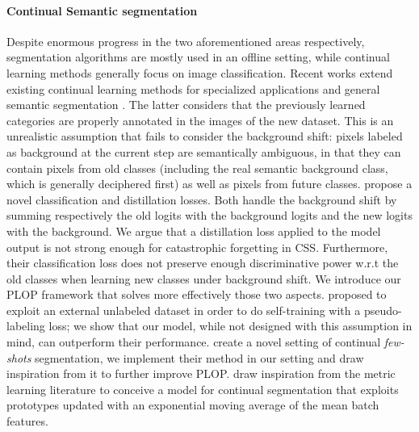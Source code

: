 \paragraph{Continual Semantic segmentation} Despite enormous progress in the two aforementioned
areas respectively, segmentation algorithms are mostly used in an offline setting, while continual
learning methods generally focus on image classification. Recent works extend existing continual
learning methods \citep{li2018lwf,hou2019ucir} for specialized applications
\citep{ozdemir2018learnthenewkeeptheold,ozdemir2019segmentationanotomical,tasar19incrementsegmentationremotesensing}
and general semantic segmentation \citep{michieli2019ilt}. The latter considers that the previously
learned categories are properly annotated in the images of the new dataset. This is an unrealistic
assumption that fails to consider the background shift: pixels labeled as background at the current
step are semantically ambiguous, in that they can contain pixels from old classes (including the
real semantic background class, which is generally deciphered first) as well as pixels from future
classes. \citet{cermelli2020modelingthebackground} propose a novel classification and distillation
losses. Both handle the background shift by summing respectively the old logits with the background
logits and the new logits with the background. We argue that a distillation loss applied to the
model output is not strong enough for catastrophic forgetting in \ac{CSS}. Furthermore, their
classification loss does not preserve enough discriminative power w.r.t the old classes when
learning new classes under background shift. We introduce our PLOP framework that solves more
effectively those two aspects. \citet{yu2020continualsegmentationselftraining} proposed to exploit an
external unlabeled dataset in order to do self-training with a pseudo-labeling loss; we show that
our model, while not designed with this assumption in mind, can outperform their performance.
\citet{cermelli2020fewshotcontinualsegm} create a novel setting of continual \textit{few-shots}
segmentation, we implement their method in our setting and draw inspiration from it to further
improve PLOP. \citet{michieli2021sdr} draw inspiration from the metric learning literature to
conceive a model for continual segmentation that exploits prototypes updated with an exponential
moving average of the mean batch features.

